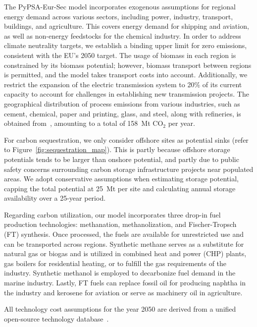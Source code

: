 \documentclass[conference]{IEEEtran}
\newcommand{\carbon}{CO$_2$ }
\begin{document}
The PyPSA-Eur-Sec model incorporates exogenous assumptions for regional energy demand across various sectors, including power, industry, transport, buildings, and agriculture. This covers energy demand for shipping and aviation, as well as non-energy feedstocks for the chemical industry. In order to address climate neutrality targets, we establish a binding upper limit for zero emissions, consistent with the EU's 2050 target. The usage of biomass in each region is constrained by its biomass potential; however, biomass transport between regions is permitted, and the model takes transport costs into account. Additionally, we restrict the expansion of the electric transmission system to 20\% of its current capacity to account for challenges in establishing new transmission projects. The geographical distribution of process emissions from various industries, such as cement, chemical, paper and printing, glass, and steel, along with refineries, is obtained from~\cite{piamanzGeoreferencedIndustrialSites2018}, amounting to a total of 158~Mt \carbon per year.

For carbon sequestration, we only consider offshore sites as potential sinks (refer to Figure~\ref{fig:sequestration_map}). This is partly because offshore storage potentials tends to be larger than onshore potential, and partly due to public safety concerns surrounding carbon storage infrastructure projects near populated areas. We adopt conservative assumptions when estimating storage potential, capping the total potential at 25~Mt per site and calculating annual storage availability over a 25-year period.

Regarding carbon utilization, our model incorporates three drop-in fuel production technologies: methanation, methanolization, and Fischer-Tropsch (FT) synthesis. Once processed, the fuels are available for unrestricted use and can be transported across regions. Synthetic methane serves as a substitute for natural gas or biogas and is utilized in combined heat and power (CHP) plants, gas boilers for residential heating, or to fulfill the gas requirements of the industry. Synthetic methanol is employed to decarbonize fuel demand in the marine industry. Lastly, FT fuels can replace fossil oil for producing naphtha in the industry and kerosene for aviation or serve as machinery oil in agriculture.

All technology cost assumptions for the year 2050 are derived from a unified open-source technology database~\cite{lisazeyenPyPSATechnologydataTechnology2023}.
\end{document}
